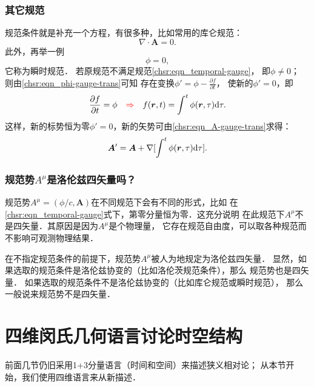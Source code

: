 \subsubsection{其它规范}
规范条件就是补充一个方程，有很多种\cite{jackson2002-LC}，比如常用的库仑规范：
\begin{equation}
    \nabla \cdot \boldsymbol{A} = 0 .
\end{equation}
此外，再举一例
\begin{equation}\label{chsr:eqn_temporal-gauge}
	\phi = 0,
\end{equation}
它称为瞬时规范．
若原规范不满足规范\eqref{chsr:eqn_temporal-gauge}，
即$\phi\neq 0$；
则由\eqref{chsr:eqn_phi-gauge-trans}可知
存在变换$\phi' = \phi -\frac{\partial f}{\partial t}$，
使新的$\phi' =0$，即
\begin{equation}
	\frac{\partial f}{\partial t} = \phi {\quad \color{red}\Rightarrow\quad}
	f(\boldsymbol{r},t) = \int^{t} \phi(\boldsymbol{r},\tau) {\rm d}\tau .
\end{equation}
这样，新的标势恒为零$\phi' =0$，新的矢势可由\eqref{chsr:eqn_A-gauge-trans}求得：
\begin{equation}
    \boldsymbol{A}' = \boldsymbol{A} + \nabla [ \int^{t} \phi(\boldsymbol{r},\tau) {\rm d}\tau ] .
\end{equation}




\subsubsection{规范势$A^\mu$是洛伦兹四矢量吗？}\label{chsr:sec_isAvec}
规范势$A^\mu =(\phi/c,\boldsymbol{A})$在不同规范下会有不同的形式，比如
在\eqref{chsr:eqn_temporal-gauge}式下，第零分量恒为零．这充分说明
在此规范下$A^\mu${\heiti 不}是四矢量．其原因是因为$A^\mu$是个物理量，
它存在规范自由度，可以取各种规范而不影响可观测物理结果．

在不指定规范条件的前提下，规范势$A^\mu$被{\heiti 人为地规定}为洛伦兹四矢量．
显然，如果选取的规范条件是洛伦兹协变的（比如洛伦茨规范条件），那么
规范势也是四矢量．
如果选取的规范条件{\heiti 不}是洛伦兹协变的（比如库仑规范或瞬时规范），
那么一般说来规范势{\heiti 不}是四矢量．











\section{四维闵氏几何语言讨论时空结构}\label{chsr:sec_spacetime-structure-Min}
前面几节仍旧采用1+3分量语言（时间和空间）来描述狭义相对论；
从本节开始，我们使用四维语言来从新描述．

